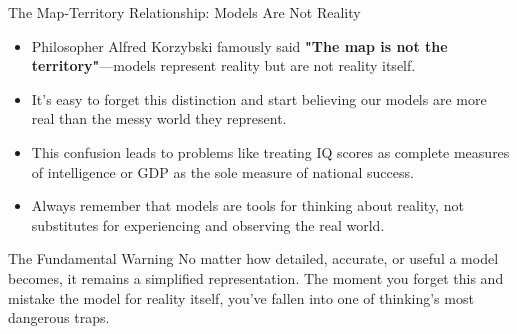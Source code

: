 \documentclass{beamer}
\begin{document}
	\begin{frame}{The Map-Territory Relationship: Models Are Not Reality}
		\begin{itemize}
			\item Philosopher Alfred Korzybski famously said \textbf{"The map is not the territory"}—models represent reality but are not reality itself.
			\item It's easy to forget this distinction and start believing our models are more real than the messy world they represent.
			\item This confusion leads to problems like treating IQ scores as complete measures of intelligence or GDP as the sole measure of national success.
			\item Always remember that models are tools for thinking about reality, not substitutes for experiencing and observing the real world.
		\end{itemize}
		
		\begin{alertblock}{The Fundamental Warning}
			No matter how detailed, accurate, or useful a model becomes, it remains a simplified representation. The moment you forget this and mistake the model for reality itself, you've fallen into one of thinking's most dangerous traps.
		\end{alertblock}
	\end{frame}
	
\end{document}
